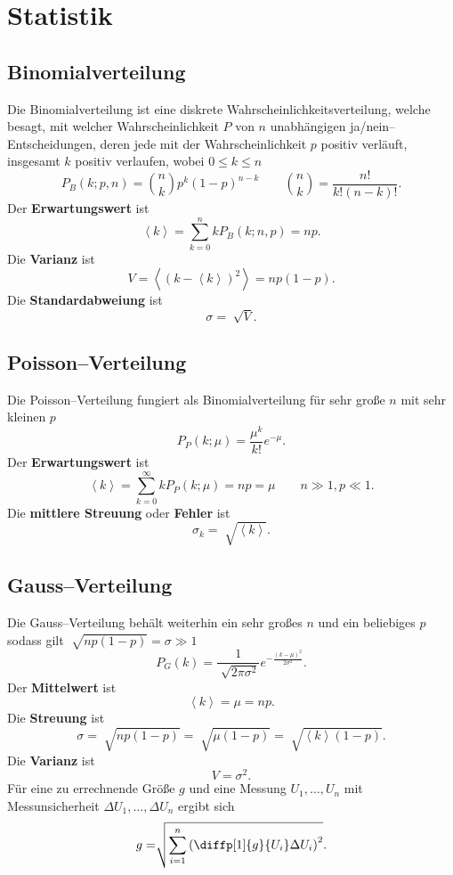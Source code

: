 \documentclass[a4paper,12pt]{article}
\begin{document}
\tableofcontents


\newpage


\section{Statistik}
\subsection{Binomialverteilung}
Die Binomialverteilung ist eine diskrete Wahrscheinlichkeitsverteilung, welche besagt, mit welcher Wahrscheinlichkeit $P$ von $n$ unabhängigen \glqq ja/nein\grqq{}--Entscheidungen, deren jede mit der Wahrscheinlichkeit $p$ positiv verläuft, insgesamt $k$ positiv verlaufen, wobei $0\leq k\leq n$
\[ 
        P_B\left(k;p,n\right)={n\choose k}p^k\left(1-p\right)^{n-k}\qquad {n\choose k}=\dfrac{n!}{k!\left(n-k\right)!}
.\] 
Der \textbf{Erwartungswert} ist
\[ 
        \left\langle k\right\rangle =\sum_{k=0}^{n}kP_B\left(k;n,p\right)=np
.\] 
Die \textbf{Varianz} ist
\[ 
        V=\left\langle \left(k-\left\langle k\right\rangle \right)^2\right\rangle =np\left(1-p\right)
.\] 
Die \textbf{Standardabweiung} ist
\[ 
        \sigma =\sqrt[ ]{V}
.\] 

\subsection{Poisson--Verteilung}
Die Poisson--Verteilung fungiert als Binomialverteilung für sehr große $n$ mit sehr kleinen $p$
\[ 
        P_P\left(k;\mu \right)=\dfrac{\mu ^k}{k!}e^{-\mu }
.\] 
Der \textbf{Erwartungswert} ist
\[ 
        \left\langle k\right\rangle =\sum_{k=0}^{\infty}kP_P\left(k;\mu \right)=np=\mu \qquad n\gg1,p\ll1
.\] 
Die \textbf{mittlere Streuung} oder \textbf{Fehler} ist
\[ 
        \sigma _k=\sqrt[ ]{\left\langle k\right\rangle }
.\] 

\subsection{Gauss--Verteilung}
Die Gauss--Verteilung behält weiterhin ein sehr großes $n$ und ein beliebiges $p$ sodass gilt $\sqrt[ ]{np\left(1-p\right)}=\sigma \gg1$
\[ 
        P_G\left(k\right)=\dfrac{1}{\sqrt[ ]{2\pi \sigma ^2}}e^{-\tfrac{\left(k-\mu \right)^2}{2\sigma ^2}}
.\] 
Der \textbf{Mittelwert} ist
\[ 
        \left\langle k\right\rangle =\mu =np
.\] 
Die \textbf{Streuung} ist
\[ 
        \sigma =\sqrt[ ]{np\left(1-p\right)}=\sqrt[ ]{\mu \left(1-p\right)}=\sqrt[ ]{\left\langle k\right\rangle \left(1-p\right)}
.\] 
Die \textbf{Varianz} ist
\[ 
        V=\sigma ^2
.\] 
Für eine zu errechnende Größe $g$ und eine Messung $U_1,\hdots ,U_n$ mit Messunsicherheit $\Delta U_1,\hdots ,\Delta U_n$ ergibt sich
\[ 
        g=\sqrt[ ]{\sum_{i=1}^{n}\left(\diffp[1]{g}{U_i}\Delta U_i\right)^2}
.\] 

\end{document}
